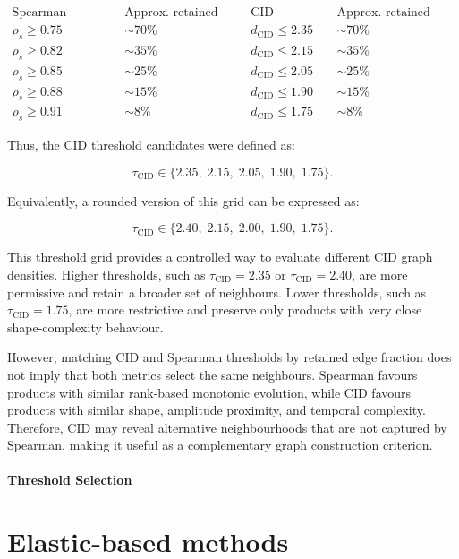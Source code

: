 \[
\begin{array}{c|c|c|c}
\text{Spearman threshold} & \text{Approx. retained edges} & \text{CID threshold} & \text{Approx. retained edges} \\
\hline
\rho_s \geq 0.75 & \sim 70\% & d_{\text{CID}} \leq 2.35 & \sim 70\% \\
\rho_s \geq 0.82 & \sim 35\% & d_{\text{CID}} \leq 2.15 & \sim 35\% \\
\rho_s \geq 0.85 & \sim 25\% & d_{\text{CID}} \leq 2.05 & \sim 25\% \\
\rho_s \geq 0.88 & \sim 15\% & d_{\text{CID}} \leq 1.90 & \sim 15\% \\
\rho_s \geq 0.91 & \sim 8\%  & d_{\text{CID}} \leq 1.75 & \sim 8\%
\end{array}
\]

Thus, the CID threshold candidates were defined as:

\[
\tau_{\text{CID}} \in \{2.35,\; 2.15,\; 2.05,\; 1.90,\; 1.75\}.
\]

Equivalently, a rounded version of this grid can be expressed as:

\[
\tau_{\text{CID}} \in \{2.40,\; 2.15,\; 2.00,\; 1.90,\; 1.75\}.
\]

This threshold grid provides a controlled way to evaluate different CID graph densities. Higher thresholds, such as $\tau_{\text{CID}} = 2.35$ or $\tau_{\text{CID}} = 2.40$, are more permissive and retain a broader set of neighbours. Lower thresholds, such as $\tau_{\text{CID}} = 1.75$, are more restrictive and preserve only products with very close shape-complexity behaviour.

However, matching CID and Spearman thresholds by retained edge fraction does not imply that both metrics select the same neighbours. Spearman favours products with similar rank-based monotonic evolution, while CID favours products with similar shape, amplitude proximity, and temporal complexity. Therefore, CID may reveal alternative neighbourhoods that are not captured by Spearman, making it useful as a complementary graph construction criterion.


\paragraph{Threshold Selection}

\section{Elastic-based methods}
